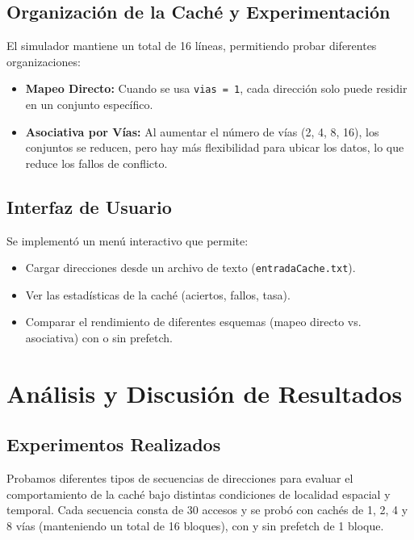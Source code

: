 \documentclass[14pt]{article}
\begin{document}
\subsection*{Organización de la Caché y Experimentación}

El simulador mantiene un total de 16 líneas, permitiendo probar diferentes organizaciones:

\begin{itemize}
    \item \textbf{Mapeo Directo:} Cuando se usa \texttt{vias = 1}, cada dirección solo puede residir en un conjunto específico.
    \item \textbf{Asociativa por Vías:} Al aumentar el número de vías (2, 4, 8, 16), los conjuntos se reducen, pero hay más flexibilidad para ubicar los datos, lo que reduce los fallos de conflicto.
\end{itemize}

\subsection*{Interfaz de Usuario}

Se implementó un menú interactivo que permite:

\begin{itemize}
    \item Cargar direcciones desde un archivo de texto (\texttt{entradaCache.txt}).
    \item Ver las estadísticas de la caché (aciertos, fallos, tasa).
    \item Comparar el rendimiento de diferentes esquemas (mapeo directo vs. asociativa) con o sin prefetch.
\end{itemize}

\section*{Análisis y Discusión de Resultados}

\subsection*{Experimentos Realizados}

Probamos diferentes tipos de secuencias de direcciones para evaluar el comportamiento de la caché bajo distintas condiciones de localidad espacial y temporal. Cada secuencia consta de 30 accesos y se probó con cachés de 1, 2, 4 y 8 vías (manteniendo un total de 16 bloques), con y sin prefetch de 1 bloque.
\end{document}
